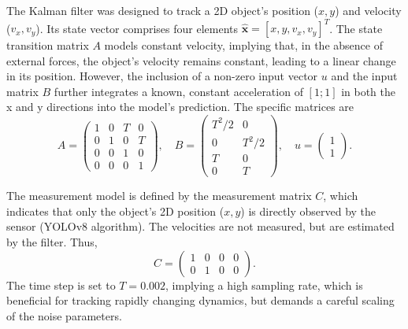 The Kalman filter was designed to track a 2D object's position ($x, y$) and velocity ($v_x, v_y$). Its state vector comprises four elements $\hat{\bm{x}} = [x, y, v_x, v_y]^T$. The state transition matrix $A$ models constant velocity, implying that, in the absence of external forces, the object's velocity remains constant, leading to a linear change in its position. However, the inclusion of a non-zero input vector $u$ and the input matrix $B$ further integrates a known, constant acceleration of $[1; 1]$ in both the x and y directions into the model's prediction. The specific matrices are
\begin{equation*}
A = \begin{pmatrix} 1 & 0 & T & 0 \\ 0 & 1 & 0 & T \\ 0 & 0 & 1 & 0 \\ 0 & 0 & 0 & 1 \end{pmatrix}, \quad B = \begin{pmatrix} T^2/2 & 0 \\ 0 & T^2/2 \\ T & 0 \\ 0 & T \end{pmatrix}, \quad u = \begin{pmatrix} 1 \\ 1 \end{pmatrix}.
\end{equation*}

The measurement model is defined by the measurement matrix $C$, which indicates that only the object's 2D position ($x, y$) is directly observed by the sensor (YOLOv8 algorithm). The velocities are not measured, but are estimated by the filter. Thus,
\begin{equation*}
C = \begin{pmatrix} 1 & 0 & 0 & 0 \\ 0 & 1 & 0 & 0 \end{pmatrix}.
\end{equation*}
The time step is set to $T = 0.002$, implying a high sampling rate, which is beneficial for tracking rapidly changing dynamics, but demands a careful scaling of the noise parameters.

